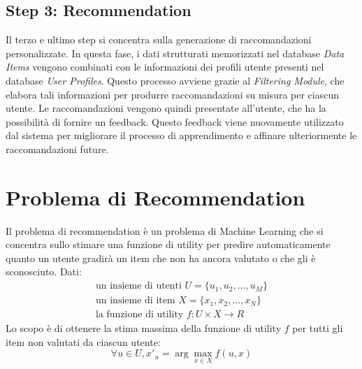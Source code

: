 \documentclass{report}
\begin{document}
	\subsection*{Step 3: Recommendation}
	Il terzo e ultimo step si concentra sulla generazione di raccomandazioni personalizzate. In questa fase, i dati strutturati memorizzati nel database \emph{Data Items} vengono combinati con le informazioni dei profili utente presenti nel database \emph{User Profiles}. Questo processo avviene grazie al \emph{Filtering Module}, che elabora tali informazioni per produrre raccomandazioni su misura per ciascun utente. Le raccomandazioni vengono quindi presentate all'utente, che ha la possibilità di fornire un feedback. Questo feedback viene nuovamente utilizzato dal sistema per migliorare il processo di apprendimento e affinare ulteriormente le raccomandazioni future.

	\section{Problema di Recommendation}
	Il problema di recommendation è un problema di Machine Learning che si concentra sullo stimare una funzione di utility per predire automaticamente quanto un utente gradirà un item che non ha ancora valutato o che gli è sconosciuto. Dati:
	\[
	\begin{array}{l}
		\text{un insieme di utenti }U = \{u_1, u_2, \ldots, u_M\}\\
		\text{un insieme di item }X = \{x_1, x_2, \ldots, x_N\}\\
		\text{la funzione di utility }f: U \times X \rightarrow R
	\end{array}
	\]
	Lo scopo è di ottenere la stima massima della funzione di utility $f$ per tutti gli item non valutati da ciascun utente:
	\[
		\forall u \in U, x'_u = \arg\max_{x \in X} f(u, x)
	\]
\end{document}
